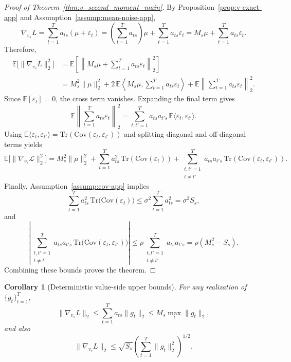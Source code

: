 \documentclass{article}
\theoremstyle{plain}
\newtheorem{corollary}{Corollary}
\theoremstyle{definition}
\theoremstyle{remark}
\begin{document}
\begin{proof}[Proof of Theorem~\ref{thm:v_second_moment_main}]
By Proposition~\ref{prop:v-exact-app} and Assumption~\ref{assump:mean-noise-app},
\[
    \nabla_{v_s}L = \sum_{t=1}^T a_{ts}(\mu + \varepsilon_t) = \left(\sum_{t=1}^T a_{ts}\right)\mu + \sum_{t=1}^T a_{ts}\varepsilon_t = M_s \mu + \sum_{t=1}^T a_{ts}\varepsilon_t.
\]
Therefore,
\[\begin{aligned}
    \mathbb{E}\bigl[\|\nabla_{v_s}L\|_2^2\bigr]
    &= \mathbb{E}\left[\left\|M_s\mu + \sum_{t=1}^T a_{ts}\varepsilon_t\right\|_2^2\right] \\
    &= M_s^2\|\mu\|_2^2 + 2\,\mathbb{E}\left\langle M_s\mu, \sum_{t=1}^T a_{ts}\varepsilon_t \right\rangle + \mathbb{E}\left\|\sum_{t=1}^T a_{ts}\varepsilon_t\right\|_2^2.
\end{aligned}\]
Since $\mathbb{E}[\varepsilon_t]=0$, the cross term vanishes. Expanding the final term gives
\[
    \mathbb{E}\left\|\sum_{t=1}^T a_{ts}\varepsilon_t\right\|_2^2
    = \sum_{t,t'=1}^T a_{ts} a_{t's} \, \mathbb{E}\langle \varepsilon_t, \varepsilon_{t'} \rangle.
\]
Using $\mathbb{E}\langle \varepsilon_t, \varepsilon_{t'} \rangle = \mathrm{Tr}(\mathrm{Cov}(\varepsilon_t,\varepsilon_{t'}))$ and splitting diagonal and off-diagonal terms yields
\[
\mathbb{E}\big[\|\nabla_{v_s}\mathcal{L}\|_2^2\big]
=
M_s^2\|\mu\|_2^2
+
\sum_{t=1}^{T} a_{ts}^2 \, \mathrm{Tr}(\mathrm{Cov}(\varepsilon_t))
+
\sum_{\substack{t,t'=1 \\ t\ne t'}}^{T} a_{ts} a_{t's} \, \mathrm{Tr}(\mathrm{Cov}(\varepsilon_t,\varepsilon_{t'})).
\]
Finally, Assumption~\ref{assump:cov-app} implies
\[
    \sum_{t=1}^T a_{ts}^2 \, \mathrm{Tr}\!\bigl(\mathrm{Cov}(\varepsilon_t)\bigr) \le \sigma^2 \sum_{t=1}^T a_{ts}^2 = \sigma^2 S_s,
\]
and
\[
    \left|\sum_{\substack{t,t'=1 \\ t\neq t'}}^T a_{ts} a_{t's} \, \mathrm{Tr}\!\bigl(\mathrm{Cov}(\varepsilon_t,\varepsilon_{t'})\bigr)\right|
    \le \rho \sum_{\substack{t,t'=1 \\ t\neq t'}}^T a_{ts} a_{t's}
    = \rho(M_s^2 - S_s).
\]
Combining these bounds proves the theorem.
\end{proof}

\begin{corollary}[Deterministic value-side upper bounds]\label{cor:v-deterministic-app}
For any realization of $\{g_t\}_{t=1}^T$,
\[
    \|\nabla_{v_s}L\|_2 \le \sum_{t=1}^T a_{ts}\|g_t\|_2 \le M_s \max_t \|g_t\|_2,
\]
and also
\[
    \|\nabla_{v_s}L\|_2 \le \sqrt{S_s} \left(\sum_{t=1}^T \|g_t\|_2^2\right)^{1/2}.
\]
\end{corollary}
\end{document}
